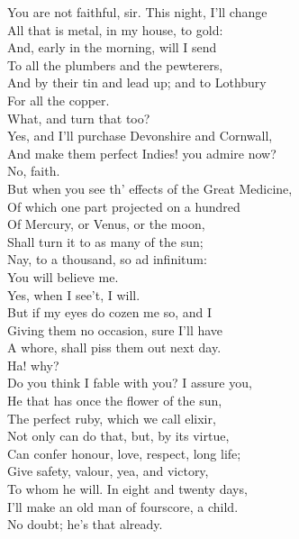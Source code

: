 \documentclass{memoir}
\begin{document}
\begin{drama*}
 You are not faithful, sir. This night, I'll change\\
 All that is metal, in my house, to gold:\\
 And, early in the morning, will I send\\
 To all the plumbers and the pewterers,\\
 And by their tin and lead up; and to Lothbury\\
 For all the copper.\\
\surlyspeaks {} What, and turn that too?\\
\mammonspeaks  Yes, and I'll purchase Devonshire and Cornwall,\\
 And make them perfect Indies! you admire now?\\
\surlyspeaks  No, faith.\\
\mammonspeaks {} But when you see th' effects of the Great Medicine,\\
 Of which one part projected on a hundred\\
 Of Mercury, or Venus, or the moon,\\
 Shall turn it to as many of the sun;\\
 Nay, to a thousand, so ad infinitum:\\
 You will believe me.\\
\surlyspeaks {} Yes, when I see't, I will.\\
 But if my eyes do cozen me so, and I\\
 Giving them no occasion, sure I'll have\\
 A whore, shall piss them out next day.\\
\mammonspeaks {} Ha! why?\\
 Do you think I fable with you? I assure you,\\
 He that has once the flower of the sun,\\
 The perfect ruby, which we call elixir,\\
 Not only can do that, but, by its virtue,\\
 Can confer honour, love, respect, long life;\\
 Give safety, valour, yea, and victory,\\
 To whom he will. In eight and twenty days,\\
 I'll make an old man of fourscore, a child.\\
\surlyspeaks  No doubt; he's that already.\\

\end{drama*}
\end{document}
